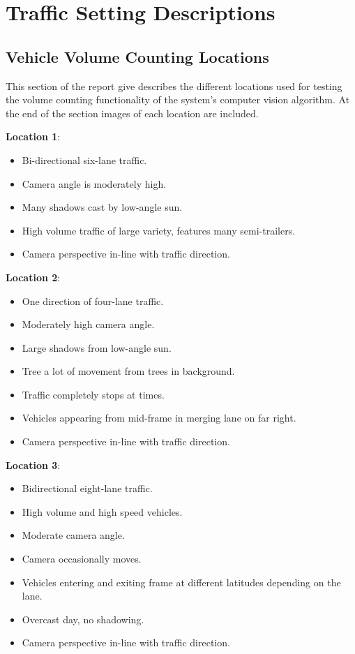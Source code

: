 \chapter{Traffic Setting Descriptions}
\label{appendices:traffic_descriptors}

\section{Vehicle Volume Counting Locations}

This section of the report give describes the different locations used for testing the volume counting functionality of the system's computer vision algorithm. At the end of the section images of each location are included.

\textbf{Location 1}: 

\begin{itemize}
    \item Bi-directional six-lane traffic.
    \item Camera angle is moderately high. 
    \item Many shadows cast by low-angle sun.
    \item High volume traffic of large variety, features many semi-trailers. 
    \item Camera perspective in-line with traffic direction.
\end{itemize}
 

\textbf{Location 2}:

\begin{itemize}
    \item One direction of four-lane traffic.
    \item Moderately high camera angle.
    \item Large shadows from low-angle sun.
    \item Tree a lot of movement from trees in background.
    \item Traffic completely stops at times.
    \item Vehicles appearing from mid-frame in merging lane on far right.
    \item Camera perspective in-line with traffic direction.
\end{itemize}


\textbf{Location 3}: 

\begin{itemize}
    \item Bidirectional eight-lane traffic.
    \item High volume and high speed vehicles.
    \item Moderate camera angle.
    \item Camera occasionally moves.
    \item Vehicles entering and exiting frame at different latitudes depending on the lane.
    \item Overcast day, no shadowing. 
    \item Camera perspective in-line with traffic direction.
\end{itemize}


